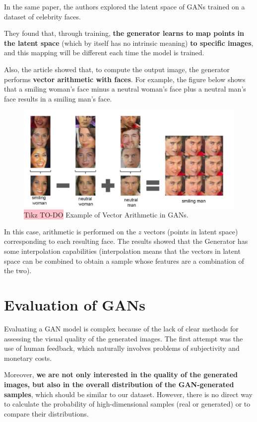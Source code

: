 In the same paper, the authors explored the latent space of GANs trained on a dataset of celebrity faces. 

They found that, through training, \textbf{the generator learns to map points in the latent space} (which by itself has no intrinsic meaning) \textbf{to specific images}, and this mapping will be different each time the model is trained.

Also, the article showed that, to compute the output image, the generator performs \textbf{vector arithmetic with faces}. For example, the figure below shows that a smiling woman's face minus a neutral woman's face plus a neutral man's face results in a smiling man's face.

\begin{figure}[!htbp]
    \centering
    \includegraphics[width=0.8\linewidth]{tikz/chapter9 - Arithmetics of GAN.png}
    \caption{{\color{red}\colorbox{pink}{Tikz TO-DO}} Example of Vector Arithmetic in GANs.}
\end{figure}

In this case, arithmetic is performed on the $z$ vectors (points in latent space) corresponding to each resulting face. The results showed that the Generator has some interpolation capabilities (interpolation means that the vectors in latent space can be combined to obtain a sample whose features are a combination of the two).

\section{Evaluation of GANs}

Evaluating a GAN model is complex because of the lack of clear methods for assessing the visual quality of the generated images. The first attempt was the use of human feedback, which naturally involves problems of subjectivity and monetary costs.

Moreover, \textbf{we are not only interested in the quality of the generated images, but also in the overall distribution of the GAN-generated samples}, which should be similar to our dataset. However, there is no direct way to calculate the probability of high-dimensional samples (real or generated) or to compare their distributions.

